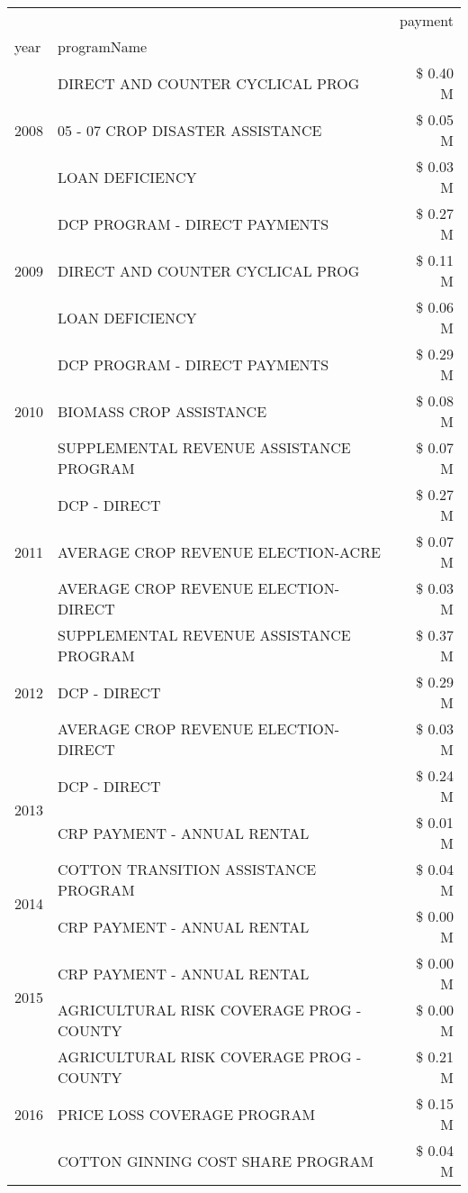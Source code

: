 \begin{tabular}{llr}
\toprule
 &  & payment \\
year & programName &  \\
\midrule
\multirow[t]{3}{*}{2008} & DIRECT AND COUNTER CYCLICAL PROG & \$ 0.40 M \\
 & 05 - 07 CROP DISASTER ASSISTANCE & \$ 0.05 M \\
 & LOAN DEFICIENCY & \$ 0.03 M \\
\cline{1-3}
\multirow[t]{3}{*}{2009} & DCP PROGRAM - DIRECT PAYMENTS & \$ 0.27 M \\
 & DIRECT AND COUNTER CYCLICAL PROG & \$ 0.11 M \\
 & LOAN DEFICIENCY & \$ 0.06 M \\
\cline{1-3}
\multirow[t]{3}{*}{2010} & DCP PROGRAM - DIRECT PAYMENTS & \$ 0.29 M \\
 & BIOMASS CROP ASSISTANCE & \$ 0.08 M \\
 & SUPPLEMENTAL REVENUE ASSISTANCE PROGRAM & \$ 0.07 M \\
\cline{1-3}
\multirow[t]{3}{*}{2011} & DCP - DIRECT & \$ 0.27 M \\
 & AVERAGE CROP REVENUE ELECTION-ACRE & \$ 0.07 M \\
 & AVERAGE CROP REVENUE ELECTION-DIRECT & \$ 0.03 M \\
\cline{1-3}
\multirow[t]{3}{*}{2012} & SUPPLEMENTAL REVENUE ASSISTANCE PROGRAM & \$ 0.37 M \\
 & DCP - DIRECT & \$ 0.29 M \\
 & AVERAGE CROP REVENUE ELECTION-DIRECT & \$ 0.03 M \\
\cline{1-3}
\multirow[t]{2}{*}{2013} & DCP - DIRECT & \$ 0.24 M \\
 & CRP PAYMENT - ANNUAL RENTAL & \$ 0.01 M \\
\cline{1-3}
\multirow[t]{2}{*}{2014} & COTTON TRANSITION ASSISTANCE PROGRAM & \$ 0.04 M \\
 & CRP PAYMENT - ANNUAL RENTAL & \$ 0.00 M \\
\cline{1-3}
\multirow[t]{2}{*}{2015} & CRP PAYMENT - ANNUAL RENTAL & \$ 0.00 M \\
 & AGRICULTURAL RISK COVERAGE PROG - COUNTY & \$ 0.00 M \\
\cline{1-3}
\multirow[t]{3}{*}{2016} & AGRICULTURAL RISK COVERAGE PROG - COUNTY & \$ 0.21 M \\
 & PRICE LOSS COVERAGE PROGRAM & \$ 0.15 M \\
 & COTTON GINNING COST SHARE PROGRAM & \$ 0.04 M \\

\end{tabular}
